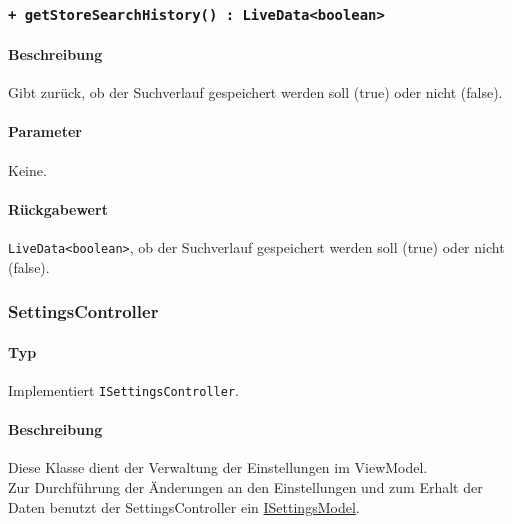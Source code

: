 \subsubsection*{\texttt{+ getStoreSearchHistory() : LiveData<boolean>}}\label{App_Settings_ISettingsController_getStoreSearchhistory}%
\paragraph*{Beschreibung}
Gibt zurück, ob der Suchverlauf gespeichert werden soll (true) oder nicht (false).
\paragraph*{Parameter}
Keine.
\paragraph*{Rückgabewert}
\texttt{LiveData<boolean>}, ob der Suchverlauf gespeichert werden soll (true) oder nicht (false).

\subsubsection{SettingsController}\label{App_Settings_SettingsController}
\paragraph*{Typ}
Implementiert \texttt{ISettingsController}.
\paragraph*{Beschreibung}
Diese Klasse dient der Verwaltung der Einstellungen im ViewModel. \\
Zur Durchführung der Änderungen an den Einstellungen und zum Erhalt der Daten benutzt der SettingsController ein \hyperref[App_Settings_ISettingsController]{ISettingsModel}.
